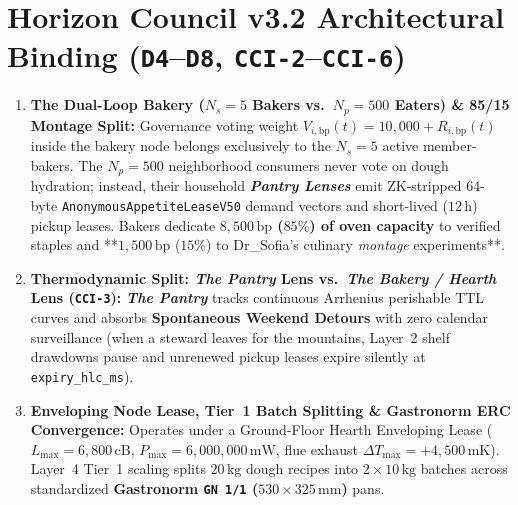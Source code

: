 \section{Horizon Council v3.2 Architectural Binding (\texttt{D4}--\texttt{D8}, \texttt{CCI-2}--\texttt{CCI-6})}
\begin{enumerate}
    \item \textbf{The Dual-Loop Bakery ($N_s = 5$ Bakers vs.\ $N_p = 500$ Eaters) \& 85/15 Montage Split:} Governance voting weight $V_{i,\mathrm{bp}}(t) = 10{,}000 + R_{i,\mathrm{bp}}(t)$ inside the bakery node belongs exclusively to the $N_s = 5$ active member-bakers. The $N_p = 500$ neighborhood consumers never vote on dough hydration; instead, their household \textbf{\textit{Pantry Lenses}} emit ZK-stripped 64-byte \texttt{AnonymousAppetiteLeaseV50} demand vectors and short-lived ($12\,\mathrm{h}$) pickup leases. Bakers dedicate \textbf{$8{,}500\,\mathrm{bp}$ ($85\%$) of oven capacity} to verified staples and **$1{,}500\,\mathrm{bp}$ ($15\%$) to Dr\_Sofia's culinary \textit{montage} experiments**.
    \item \textbf{Thermodynamic Split: \textit{The Pantry} Lens vs.\ \textit{The Bakery / Hearth} Lens (\texttt{CCI-3}):} \textbf{\textit{The Pantry}} tracks continuous Arrhenius perishable TTL curves and absorbs \textbf{Spontaneous Weekend Detours} with zero calendar surveillance (when a steward leaves for the mountains, Layer~2 shelf drawdowns pause and unrenewed pickup leases expire silently at \texttt{expiry\_hlc\_ms}).
    \item \textbf{Enveloping Node Lease, Tier~1 Batch Splitting \& Gastronorm ERC Convergence:} Operates under a Ground-Floor Hearth Enveloping Lease ($L_{\max} = 6{,}800\,\mathrm{cB}$, $P_{\max} = 6{,}000{,}000\,\mathrm{mW}$, flue exhaust $\Delta T_{\max} = +4{,}500\,\mathrm{mK}$). Layer~4 Tier~1 scaling splits $20\,\mathrm{kg}$ dough recipes into $2 \times 10\,\mathrm{kg}$ batches across standardized \textbf{Gastronorm \texttt{GN 1/1} ($530 \times 325\,\mathrm{mm}$)} pans.
\end{enumerate}

